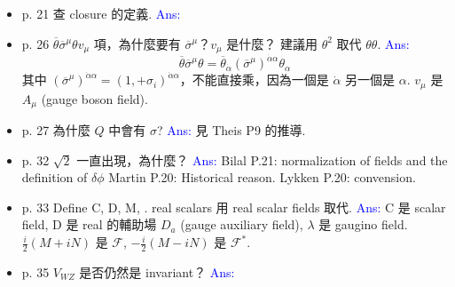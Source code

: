 \documentclass[12pt, letterpaper]{article}
\begin{document}
\begin{itemize}
\item p. 21\newline
查 closure 的定義.\newline
\textcolor{blue}{Ans:}

\item p. 26\newline
$\overline{\theta} \overline{\sigma}^{\mu} \theta v_{\mu}$ 項，為什麼要有 $\overline{\sigma}^{\mu}$？$v_{\mu}$ 是什麼？\newline
建議用 $\theta^{2}$ 取代 $\theta \theta$.\newline
\textcolor{blue}{Ans:}
\begin{equation*}
\overline{\theta} \overline{\sigma}^{\mu} \theta = \overline{\theta}_{\dot{\alpha}} (\overline{\sigma}^{\mu})^{\dot{\alpha} \alpha} \theta_{\alpha}
\end{equation*}
其中 $(\overline{\sigma}^{\mu})^{\dot{\alpha} \alpha} = (1, +\sigma_{i})^{\dot{\alpha} \alpha}$，不能直接乘，因為一個是 ${\dot{\alpha}}$ 另一個是 $\alpha$.\newline
$v_{\mu}$ 是 $A_{\mu}$ (gauge boson field).

\item p. 27\newline
為什麼 $Q$ 中會有 $\sigma$?\newline
\textcolor{blue}{Ans:} 見 Theis P9 的推導.

\item p. 32\newline
$\sqrt{2}$ 一直出現，為什麼？\newline
\textcolor{blue}{Ans:} Bilal P.21: normalization of fields and the definition of $\delta \phi$\newline
Martin P.20: Historical reason. Lykken P.20: convension.

\item p. 33\newline
Define C, D, M, .\newline
real scalars 用 real scalar fields 取代.\newline
\textcolor{blue}{Ans:}
C 是 scalar field, D 是 real 的輔助場 $D_{a}$ (gauge auxiliary field), $\lambda$ 是 gaugino field.
$\frac{i}{2}(M + i N)$ 是 $\mathcal{F}$, $-\frac{i}{2}(M - i N)$ 是 $\mathcal{F}^{*}$.

\item p. 35\newline
$V_{WZ}$ 是否仍然是 invariant？\newline
\textcolor{blue}{Ans:}


\end{itemize}
\end{document}
